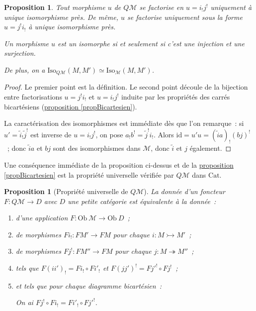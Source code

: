 \documentclass{amsart}
\newcommand{\sref}[2]{\hyperref[#2]{#1 \ref*{#2}}}
\theoremstyle{plain}
\newtheorem{prop}[theo]{Proposition}
\theoremstyle{definition}
\theoremstyle{remark}
\newcommand{\M}{\mathcal{M}}
\newcommand{\Ob}[1]{\mathrm{Ob}\:#1}
\newcommand{\Iso}[3]{\mathrm{Iso}_{#1}(#2,#3)}
\newcommand{\id}{\mathrm{id}}
\newcommand{\Cat}{\mathrm{Cat}}
\newcommand{\ra}{\rightarrow}
\begin{document}
\begin{prop}
  Tout morphisme $u$ de $Q\M$ se factorise en $u=i_!j^!$ uniquement à unique isomorphisme près. De même,
  $u$ se factorise uniquement sous la forme $u=j^!i_!$ à unique isomorphisme près.

  Un morphisme $u$ est un isomorphe si et seulement si c'est une injection et une surjection.

  De plus, on a $\Iso{Q\M}{M}{M'}\simeq \Iso{\M}{M}{M'}$.
\end{prop}

\begin{proof}
  Le premier point est la définition. Le second point découle de la bijection entre factorisations $u=j^!i_!$ et $u=i_!j^!$ induite par les propriétés
  des carrés bicartésiens (\sref{proposition}{propBicartesien}).

  La caractérisation des isomorphismes est immédiate dès que l'on remarque~:
  si $u'=\tilde{i}_!\tilde{j}^!$ est inverse de $u=i_!j^!$, on pose $a_!b^!=\tilde{j}^!i_!$. Alors $\id=u'u= (\tilde{i}a)_!(bj)^!$~;
  donc $\tilde{i}a$ et $bj$ sont des isomorphismes dans $\M$, donc $\tilde{i}$ et $j$ également.
\end{proof}

Une conséquence immédiate de la proposition ci-dessus et de la \sref{proposition}{propBicartesien} est la propriété universelle
vérifiée par $Q\M$ dans $\Cat$.

\begin{prop}[Propriété universelle de $Q\M$]\label{propUnivQM}
  La donnée d'un foncteur $F:Q\M\ra D$ avec $D$ une petite catégorie est équivalente à la donnée~:
  \begin{enumerate}
    \item d'une application $F:\Ob\M\ra \Ob D$~;
    \item de morphismes $Fi_!:FM'\ra FM$ pour chaque $i:M\rightarrowtail M'$~;
    \item de morphismes $Fj^!:FM''\ra FM$ pour chaque $j:M\twoheadrightarrow M''$~;
    \item tels que $F(ii')_!=Fi_!\circ Fi'_!$ et $F(jj')^!=Fj'^!\circ Fj^!$~;
    \item et tels que pour chaque diagramme bicartésien~:
    \begin{center}
    \end{center}
    On ai $Fj^!\circ Fi_!=Fi'_!\circ Fj'^!$.
  \end{enumerate}
\end{prop}
\end{document}
